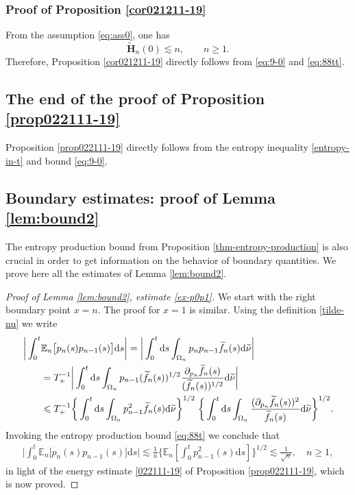 \documentclass[EJP]{ejpecp} %
\newcommand\E{{\mathbb E}}
\newcommand\Om{\Omega}
\renewcommand{\ge}{\geqslant}
\renewcommand{\le}{\leqslant}
\newcommand{\dd  }{\mathrm{d}}
\renewcommand{\tilde}{\widetilde}
\numberwithin{equation}{section}
\begin{document}
\subsubsection{Proof of Proposition {\ref{cor021211-19}}} \label{sec:endproof} From the assumption \eqref{eq:ass0}, one has
\[  \tilde{\mathbf{H}}_n(0) \lesssim n, \qquad n \geqslant 1.\]
Therefore, Proposition \ref{cor021211-19} directly follows from \eqref{eq:9-0} and \eqref{eq:88tt}.



\subsection{The end  of the proof of Proposition \ref{prop022111-19}} \label{sec:endproof-1} 

Proposition \ref{prop022111-19} directly follows from the entropy
inequality \eqref{entropy-in-t} and bound \eqref{eq:9-0}.
 
\subsection{Boundary estimates: proof of Lemma \ref{lem:bound2}}
\label{sec:conseque}
The entropy production bound from Proposition \ref{thm-entropy-production} is also crucial  in order to get information on the behavior of boundary quantities. We prove here all the estimates of Lemma \ref{lem:bound2}. 

\begin{proof}[Proof of Lemma \ref{lem:bound2}, estimate \eqref{ex-p0p1}]
We start with the right boundary point $x=n$. The proof  for $x=1$ is similar. Using the definition \eqref{tilde-nu} we  write
\begin{align}
\label{023112-19a}
  \bigg|\int_0^t& \E_n  \big[p_n(s)p_{n-1}(s)
   \big]\dd s\bigg| =\bigg|\int_0^t \dd s\int_{\Om_n}p_np_{n-1}\tilde f_n(s) \dd\tilde\nu
   \bigg| \notag \\ 
&
=T_+^{-1}\bigg|\int_0^t\dd s\int_{\Om_n}p_{n-1}(\tilde f_n(s))^{1/2}\frac{\partial_{p_n}\tilde
   f_n(s)}{(\tilde f_n(s))^{1/2}}\dd\tilde\nu \bigg|\notag\\
&
\le T_+^{-1}\bigg\{\int_0^t\dd s\int_{\Om_n}p_{n-1}^2\tilde f_n(s)
  \dd\tilde\nu\bigg\}^{1/2}\;\bigg\{\int_0^t\dd s\int_{\Om_n}\frac{(\partial_{p_n}\tilde
   f_n(s))^2}{\tilde f_n(s)}\dd\tilde\nu\bigg\}^{1/2}.
  \end{align}
Invoking the entropy production bound \eqref{eq:88t} we conclude that 
\begin{align}
\label{023112-19b}
\bigg|\int_0^t\E_n\big[p_n(s)p_{n-1}(s)
   \big]\dd s\bigg|
\lesssim\frac{1}{n}\bigg\{\E_n\left[\int_0^tp_{n-1}^2(s) \dd
  s\right]\bigg\}^{1/2}\lesssim \frac{1}{\sqrt{n}},\quad n\ge1,
  \end{align}
in light of the energy estimate \eqref{022111-19} of Proposition \ref{prop022111-19}, which is now proved.
\end{proof}
\end{document}
